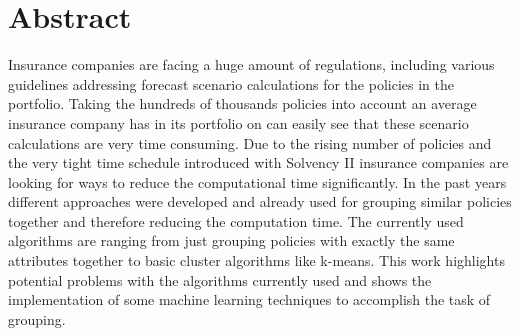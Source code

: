 

\chapter*{Abstract}
\label{cha:abstract}


Insurance companies are facing a huge amount of regulations, including various guidelines addressing forecast scenario calculations for the policies in the portfolio. Taking the hundreds of thousands policies into account an average insurance company has in its portfolio on can easily see that these scenario calculations are very time consuming. Due to the rising number of policies and the very tight time schedule introduced with Solvency II insurance companies are looking for ways to reduce the computational time significantly. In the past years different approaches were developed and already used for grouping similar policies together and therefore reducing the computation time. The currently used algorithms are ranging from just grouping policies with exactly the same attributes together to basic cluster algorithms like k-means. This work highlights potential problems with the algorithms currently used and shows the implementation of some machine learning techniques to accomplish the task of grouping. 

